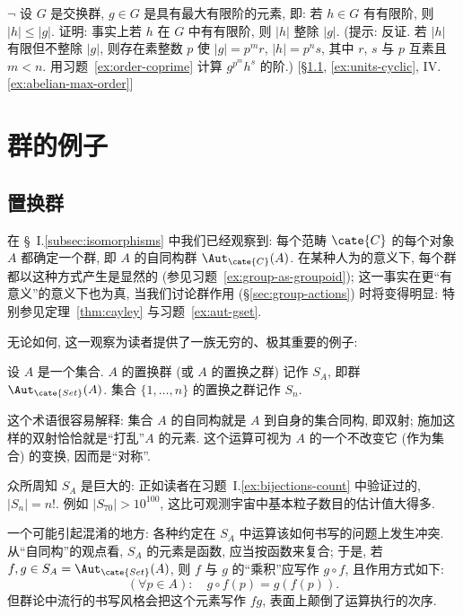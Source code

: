\begin{prob}
\label{ex:maximal-order}
$\neg$ 设 $G$ 是交换群, $g \in G$ 是具有最大有限阶的元素, 即: 若 $h \in G$ 有有限阶, 则 $|h| \leq |g|$. 证明: 事实上若 $h$ 在 $G$ 中有有限阶, 则 $|h|$ 整除 $|g|$. (提示: 反证. 若 $|h|$ 有限但不整除 $|g|$, 则存在素整数 $p$ 使 $|g| = p^m r$, $|h| = p^n s$, 其中 $r$, $s$ 与 $p$ 互素且 $m < n$. 用习题~\ref{ex:order-coprime} 计算 $g^{p^m} h^s$ 的阶.) [\S\ref{subsec:symmetric-groups}, \ref{ex:units-cyclic}, IV.\ref{ex:abelian-max-order}]
\end{prob}

\section{群的例子}
\label{sec:examples-groups}

\subsection{置换群}
\label{subsec:symmetric-groups}

在 \S~I.\ref{subsec:isomorphisms} 中我们已经观察到: 每个范畴 $\cate{C}$ 的每个对象 $A$ 都确定一个群, 即 $A$ 的自同构群 $\Aut_{\cate{C}}(A)$. 在某种人为的意义下, 每个群都以这种方式产生是显然的 (参见习题~\ref{ex:group-as-groupoid}); 这一事实在更``有意义''的意义下也为真, 当我们讨论群作用 (\S\ref{sec:group-actions}) 时将变得明显: 特别参见定理~\ref{thm:cayley} 与习题~\ref{ex:aut-gset}.

无论如何, 这一观察为读者提供了一族无穷的、极其重要的例子:

\begin{definition}
\label{def:symmetric-group}
设 $A$ 是一个集合. $A$ 的置换群%
(或 $A$ 的置换之群) 记作 $S_A$, 即群 $\Aut_{\cate{Set}}(A)$. 集合 $\{1, \ldots, n\}$ 的置换之群记作 $S_n$.
\end{definition}

这个术语很容易解释: 集合 $A$ 的自同构就是 $A$ 到自身的集合同构, 即双射; 施加这样的双射恰恰就是``打乱''$A$ 的元素. 这个运算可视为 $A$ 的一个不改变它 (作为集合) 的变换, 因而是``对称''.

众所周知 $S_A$ 是巨大的: 正如读者在习题~I.\ref{ex:bijections-count} 中验证过的, $|S_n| = n!$. 例如 $|S_{70}| > 10^{100}$, 这比可观测宇宙中基本粒子数目的估计值大得多.

一个可能引起混淆的地方: 各种约定在 $S_A$ 中运算该如何书写的问题上发生冲突. 从``自同构''的观点看, $S_A$ 的元素是函数, 应当按函数来复合; 于是, 若 $f, g \in S_A = \Aut_{\cate{Set}}(A)$, 则 $f$ 与 $g$ 的``乘积''应写作 $g \circ f$, 且作用方式如下:
\[
(\forall p \in A): \quad g \circ f (p) = g(f(p)).
\]
但群论中流行的书写风格会把这个元素写作 $fg$, 表面上颠倒了运算执行的次序.

